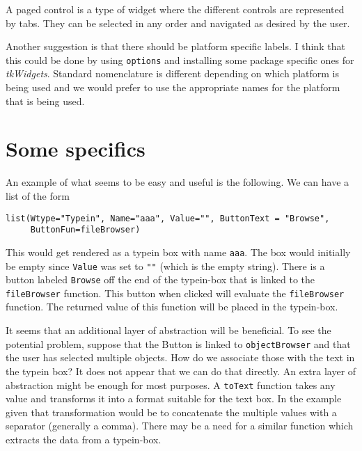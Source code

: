 \documentclass{article}
\begin{document}
A paged control is a type of widget where the different
controls are represented by tabs. They can be selected in any order
and navigated as desired by the user.

Another suggestion is that there should be platform specific labels.
I think that this could be done by using \verb+options+ and installing
some package specific ones for {\em tkWidgets}.
Standard nomenclature is different depending on which platform is
being used and we would prefer to use the appropriate names for the
platform that is being used. 

\section*{Some specifics}

An example of what seems to be easy and useful is the following.
We can have a list of the form
\begin{verbatim}
list(Wtype="Typein", Name="aaa", Value="", ButtonText = "Browse",
     ButtonFun=fileBrowser) 
\end{verbatim}
This would get rendered as a typein box with name \verb+aaa+. The box
would initially be empty since \verb+Value+ was set to \verb+""+
(which is the empty string). There is a button labeled
\verb+Browse+ off the end of the typein-box that is linked to the
\verb+fileBrowser+ function. This button when clicked will evaluate
the \verb+fileBrowser+ function.
The returned value of this function will be placed in the typein-box.

It seems that an additional layer
of abstraction will be beneficial. 
To see the potential problem, suppose that the Button is linked to
\verb+objectBrowser+ and that the user has selected multiple
objects. How do we associate those with the text in the typein box?
It does not appear that we can do that directly. An extra layer of
abstraction might be enough for most purposes. A \verb+toText+
function takes any value and transforms it into a format suitable for
the text box. In the example given that transformation would be to
concatenate the multiple values with a separator (generally a comma).
There may be a need for a similar function which extracts the data
from a typein-box.
\end{document}

